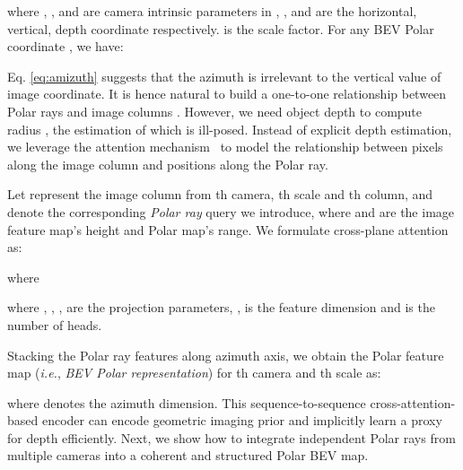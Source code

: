 \documentclass[letterpaper]{article} \usepackage{aaai23}  \usepackage{times}  \usepackage{helvet}  \usepackage{courier}  \usepackage[hyphens]{url}  \usepackage{graphicx} \urlstyle{rm} \def\UrlFont{\rm}  \usepackage{natbib}  \usepackage{caption} \frenchspacing  \setlength{\pdfpagewidth}{8.5in} \setlength{\pdfpageheight}{11in} \usepackage{algorithm}
\def\ie{\textit{i.e.}}
\begin{document}
where , ,  and  are camera intrinsic parameters in , ,  and  are the horizontal, vertical, depth coordinate respectively.  is the scale factor. For any BEV Polar coordinate , we have:


Eq. \eqref{eq:amizuth} suggests that the azimuth  is irrelevant to the vertical value of image coordinate. It is hence natural to build a one-to-one relationship between Polar rays and image columns \cite{saha2021translating}. However, we need object depth  to compute radius , the estimation of which is ill-posed. Instead of explicit depth estimation, we leverage 
the attention mechanism~\cite{vaswani2017attention} to model the relationship between pixels along the image column and positions along the Polar ray.  

Let  represent the image column from th camera, th scale and th column, and
 denote the corresponding {\em Polar ray} query we introduce, where  and  are the image feature map's height and Polar map's range. We formulate cross-plane attention as:

where

where , , , 
are the projection parameters, ,  is the feature dimension and  is the number of heads. 

Stacking the Polar ray features  along azimuth axis, we obtain the Polar feature map (\ie, {\em BEV Polar representation})  for th camera and th scale as:

where  denotes the azimuth dimension.
This sequence-to-sequence cross-attention-based encoder can encode geometric imaging prior and implicitly learn a proxy for depth efficiently. Next, we show how to integrate independent Polar rays from multiple cameras into a coherent and structured Polar BEV map. 
\end{document}
